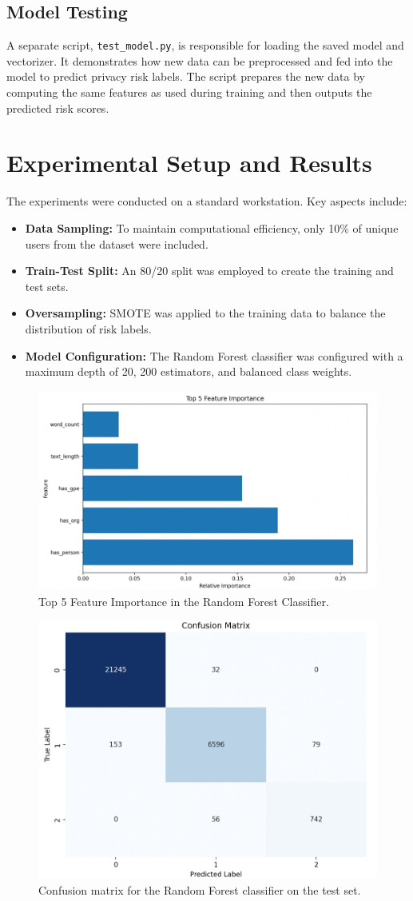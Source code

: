 \documentclass{article}
\begin{document}
\subsection{Model Testing}
A separate script, \texttt{test\_model.py}, is responsible for loading the saved model and vectorizer. It demonstrates how new data can be preprocessed and fed into the model to predict privacy risk labels. The script prepares the new data by computing the same features as used during training and then outputs the predicted risk scores.

\section{Experimental Setup and Results}
The experiments were conducted on a standard workstation. Key aspects include:
\begin{itemize}
    \item \textbf{Data Sampling:} To maintain computational efficiency, only 10\% of unique users from the dataset were included.
    \item \textbf{Train-Test Split:} An 80/20 split was employed to create the training and test sets.
    \item \textbf{Oversampling:} SMOTE was applied to the training data to balance the distribution of risk labels.
    \item \textbf{Model Configuration:} The Random Forest classifier was configured with a maximum depth of 20, 200 estimators, and balanced class weights.
\end{itemize}

\begin{figure}[ht]
    \centering
    \includegraphics[width=0.6\linewidth]{fi.png}
    \caption{Top 5 Feature Importance in the Random Forest Classifier.}
    \label{fig:feature_importance}
\end{figure}

\begin{figure}[ht]
    \centering
    \includegraphics[width=0.6\linewidth]{cm.png}
    \caption{Confusion matrix for the Random Forest classifier on the test set.}
    \label{fig:confusion}
\end{figure}
\end{document}
